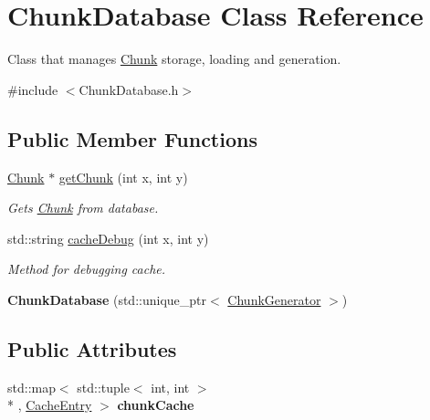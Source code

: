 \hypertarget{classChunkDatabase}{\section{Chunk\-Database Class Reference}
\label{classChunkDatabase}
}


Class that manages \hyperlink{classChunk}{Chunk} storage, loading and generation.  




{\ttfamily \#include $<$Chunk\-Database.\-h$>$}

\subsection*{Public Member Functions}
\begin{DoxyCompactItemize}
\item 
\hyperlink{classChunk}{Chunk} $\ast$ \hyperlink{classChunkDatabase_abcf683d90bbfc79651f0ccc377037c64}{get\-Chunk} (int x, int y)
\begin{DoxyCompactList}\small\item\em Gets \hyperlink{classChunk}{Chunk} from database. \end{DoxyCompactList}\item 
std\-::string \hyperlink{classChunkDatabase_a859a5a44d31f8fa40fe8d7936b27b5f5}{cache\-Debug} (int x, int y)
\begin{DoxyCompactList}\small\item\em Method for debugging cache. \end{DoxyCompactList}\item 
\hypertarget{classChunkDatabase_ac679a24342adcd98d02c3318882651e4}{{\bfseries Chunk\-Database} (std\-::unique\-\_\-ptr$<$ \hyperlink{classChunkGenerator}{Chunk\-Generator} $>$)}\label{classChunkDatabase_ac679a24342adcd98d02c3318882651e4}

\end{DoxyCompactItemize}
\subsection*{Public Attributes}
\begin{DoxyCompactItemize}
\item 
\hypertarget{classChunkDatabase_ad017d1f92ddf17b747a1ecc88e7343ad}{std\-::map$<$ std\-::tuple$<$ int, int $>$\\*
, \hyperlink{structCacheEntry}{Cache\-Entry} $>$ {\bfseries chunk\-Cache}}\label{classChunkDatabase_ad017d1f92ddf17b747a1ecc88e7343ad}

\end{DoxyCompactItemize}


